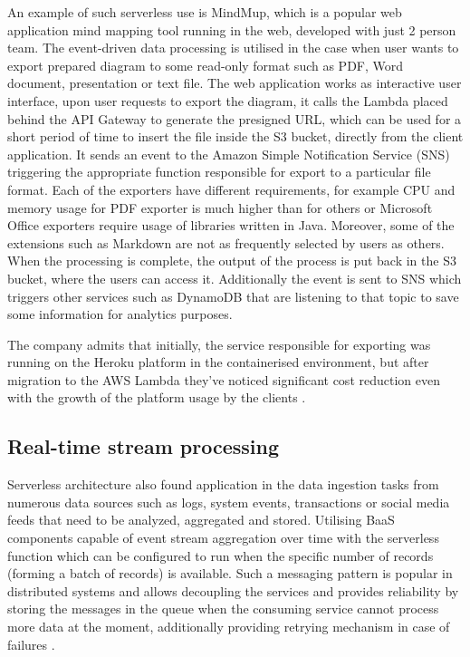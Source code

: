 An example of such serverless use is MindMup, which is a popular web application mind mapping tool running in the web, developed with just 2 person team. The event-driven data processing is utilised in the case when user wants to export prepared diagram to some read-only format such as PDF, Word document, presentation or text file. The web application works as interactive user interface, upon user requests to export the diagram, it calls the Lambda placed behind the API Gateway to generate the presigned URL, which can be used for a short period of time to insert the file inside the S3 bucket, directly from the client application. It sends an event to the Amazon Simple Notification Service (SNS) triggering the appropriate function responsible for export to a particular file format. Each of the exporters have different requirements, for example CPU and memory usage for PDF exporter is much higher than for others or Microsoft Office exporters require usage of libraries written in Java. Moreover, some of the extensions such as Markdown are not as frequently selected by users as others. When the processing is complete, the output of the process is put back in the S3 bucket, where the users can access it. Additionally the event is sent to SNS which triggers other services such as DynamoDB that are listening to that topic to save some information for analytics purposes.

The company admits that initially, the service responsible for exporting was running on the Heroku platform in the containerised environment, but after migration to the AWS Lambda they've noticed significant cost reduction even with the growth of the platform usage by the clients \cite{ServerlessApplicationsWithNodejs}.

\subsection{Real-time stream processing}

Serverless architecture also found application in the data ingestion tasks from numerous data sources such as logs, system events, transactions or social media feeds that need to be analyzed, aggregated and stored. Utilising BaaS components capable of event stream aggregation over time with the serverless function which can be configured to run when the specific number of records (forming a batch of records) is available. Such a messaging pattern is popular in distributed systems and allows decoupling the services and provides reliability by storing the messages in the queue when the consuming service cannot process more data at the moment, additionally providing retrying mechanism in case of failures \cite{ServerlessArchitectureOnAWS}.

